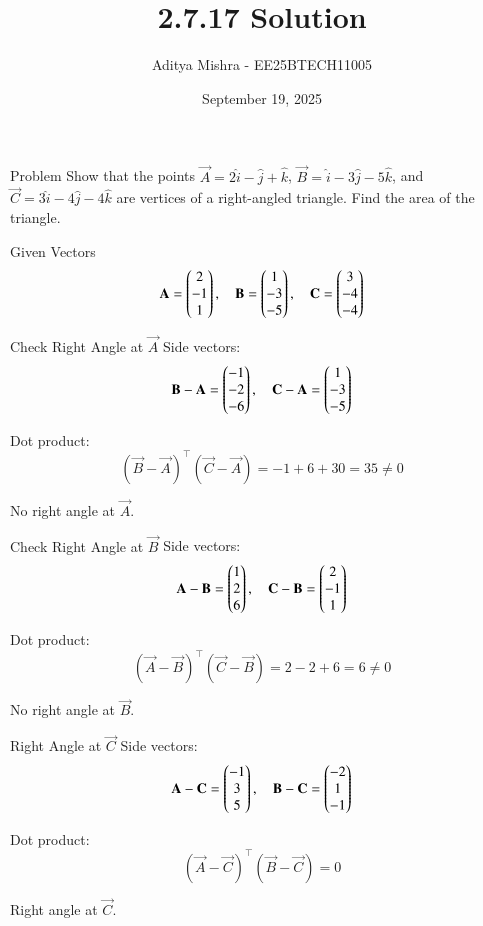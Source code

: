 \documentclass{beamer}
\title{2.7.17 Solution}
\date{September 19, 2025}
\author{Aditya Mishra - EE25BTECH11005}
\begin{document}
\frame{\titlepage}

\begin{frame}{Problem}
Show that the points \(\vec{A} = 2\hat{i} - \hat{j} + \hat{k}\), \(\vec{B} = \hat{i} - 3\hat{j} - 5\hat{k}\), and \(\vec{C} = 3\hat{i} - 4\hat{j} - 4\hat{k}\) are vertices of a right-angled triangle. Find the area of the triangle.
\end{frame}

\begin{frame}{Given Vectors}
\[
\mathbf{A} = \begin{pmatrix}2 \\ -1 \\ 1\end{pmatrix}, \quad
\mathbf{B} = \begin{pmatrix}1 \\ -3 \\ -5\end{pmatrix}, \quad
\mathbf{C} = \begin{pmatrix}3 \\ -4 \\ -4\end{pmatrix}
\]
\end{frame}

\begin{frame}{Check Right Angle at \(\vec{A}\)}
Side vectors:
\[
\mathbf{B} - \mathbf{A} = \begin{pmatrix}-1 \\ -2 \\ -6\end{pmatrix}, \quad
\mathbf{C} - \mathbf{A} = \begin{pmatrix}1 \\ -3 \\ -5\end{pmatrix}
\]

Dot product:
\[
(\vec{B} - \vec{A})^\top (\vec{C} - \vec{A}) = -1 + 6 + 30 = 35 \neq 0
\]

No right angle at \( \vec{A} \).
\end{frame}

\begin{frame}{Check Right Angle at \(\vec{B}\)}
Side vectors:
\[
\mathbf{A} - \mathbf{B} = \begin{pmatrix}1 \\ 2 \\ 6\end{pmatrix}, \quad
\mathbf{C} - \mathbf{B} = \begin{pmatrix}2 \\ -1 \\ 1\end{pmatrix}
\]

Dot product:
\[
(\vec{A} - \vec{B})^\top (\vec{C} - \vec{B}) = 2 - 2 + 6 = 6 \neq 0
\]

No right angle at \( \vec{B} \).
\end{frame}

\begin{frame}{Right Angle at \(\vec{C}\)}
Side vectors:
\[
\mathbf{A} - \mathbf{C} = \begin{pmatrix}-1 \\ 3 \\ 5\end{pmatrix}, \quad
\mathbf{B} - \mathbf{C} = \begin{pmatrix}-2 \\ 1 \\ -1\end{pmatrix}
\]

Dot product:
\[
(\vec{A} - \vec{C})^\top (\vec{B} - \vec{C}) = 0
\]

Right angle at \( \vec{C} \).
\end{frame}
\end{document}
